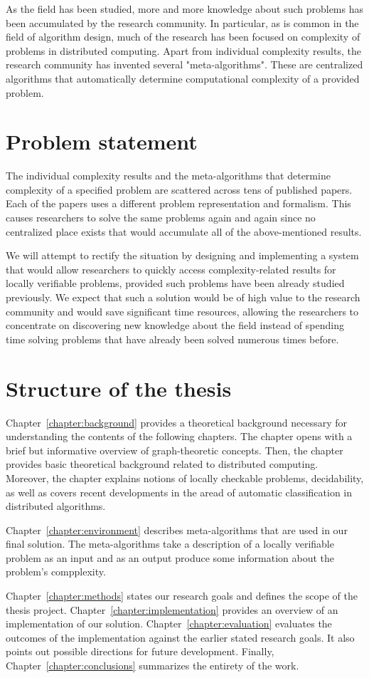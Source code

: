 As the field has been studied, more and more knowledge
about such problems has been accumulated by the
research community. In particular, as is common
in the field of algorithm design, much of the
research has been focused on complexity of
problems in distributed computing. Apart from
individual complexity results, the research
community has invented several "meta-algorithms".
These are centralized algorithms that
automatically determine
computational complexity of a provided
problem.

\section{Problem statement}

The individual complexity results and the meta-algorithms
that determine complexity of a specified problem are
scattered across tens of published papers. Each of the
papers uses a different problem representation and
formalism. This causes researchers to solve
the same problems again and again since no
centralized place exists that would accumulate all of the
above-mentioned results.

We will attempt to rectify the
situation by designing and implementing a system
that would allow researchers to quickly
access complexity-related results for locally
verifiable problems, provided such problems have been
already studied
previously. We expect that such a solution
would be of high value to the research community and
would save significant time resources, allowing the researchers
to concentrate on discovering new knowledge about the
field instead of spending time solving problems that
have already been solved numerous times before.

\section{Structure of the thesis}
\label{section:structure} 

Chapter~\ref{chapter:background} provides a theoretical
background necessary for understanding the contents of the
following chapters. The chapter opens with
a brief but informative overview of graph-theoretic
concepts. Then, the chapter provides basic
theoretical background related to distributed computing.
Moreover, the chapter explains notions of
locally checkable problems, decidability, as well as
covers recent developments in the aread of
automatic classification in distributed algorithms.

Chapter~\ref{chapter:environment} describes
meta-algorithms that are used in our final
solution. The meta-algorithms take a description
of a locally verifiable problem as an input and
as an output produce some information about the
problem's compplexity.

Chapter~\ref{chapter:methods} states our research goals
and defines the scope of the thesis project.
Chapter~\ref{chapter:implementation}
provides an overview of an implementation of
our solution. Chapter~\ref{chapter:evaluation}
evaluates the outcomes of the implementation
against the earlier stated research goals. It
also points out possible directions for
future development. Finally, Chapter~\ref{chapter:conclusions}
summarizes the entirety of the work.
